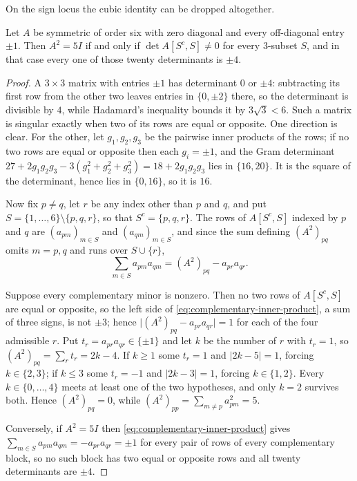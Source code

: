 On the sign locus the cubic identity can be dropped altogether.

\begin{proposition}
\label{prop:nonsingular-complementary-minors}
Let \(A\) be symmetric of order six with zero diagonal and every off-diagonal
entry \(\pm1\).  Then \(A^2=5I\) if and only if \(\det A[S^c,S]\ne0\) for every
\(3\)-subset \(S\), and in that case every one of those twenty determinants is
\(\pm4\).
\end{proposition}

\begin{proof}
A \(3\times3\) matrix with entries \(\pm1\) has determinant \(0\) or \(\pm4\):
subtracting its first row from the other two leaves entries in \(\{0,\pm2\}\)
there, so the determinant is divisible by \(4\), while Hadamard's inequality
bounds it by \(3\sqrt3<6\).  Such a matrix is singular exactly when two of its
rows are equal or opposite.  One direction is clear.  For the other, let
\(g_1,g_2,g_3\) be the pairwise inner products of the rows; if no two rows are
equal or opposite then each \(g_i=\pm1\), and the Gram determinant
\(27+2g_1g_2g_3-3(g_1^2+g_2^2+g_3^2)=18+2g_1g_2g_3\) lies in \(\{16,20\}\).  It
is the square of the determinant, hence lies in \(\{0,16\}\), so it is \(16\).

Now fix \(p\ne q\), let \(r\) be any index other than \(p\) and \(q\), and put
\(S=\{1,\dots,6\}\setminus\{p,q,r\}\), so that \(S^c=\{p,q,r\}\).  The rows of
\(A[S^c,S]\) indexed by \(p\) and \(q\) are \((a_{pm})_{m\in S}\) and
\((a_{qm})_{m\in S}\), and since the sum defining \((A^2)_{pq}\) omits
\(m=p,q\) and runs over \(S\cup\{r\}\),
\begin{equation}
\label{eq:complementary-inner-product}
 \sum_{m\in S}a_{pm}a_{qm}=(A^2)_{pq}-a_{pr}a_{qr}.
\end{equation}

Suppose every complementary minor is nonzero.  Then no two rows of
\(A[S^c,S]\) are equal or opposite, so the left side of
\eqref{eq:complementary-inner-product}, a sum of three signs, is not \(\pm3\);
hence \(\lvert(A^2)_{pq}-a_{pr}a_{qr}\rvert=1\) for each of the four admissible
\(r\).  Put \(t_r=a_{pr}a_{qr}\in\{\pm1\}\) and let \(k\) be the number of
\(r\) with \(t_r=1\), so \((A^2)_{pq}=\sum_rt_r=2k-4\).  If \(k\ge1\) some
\(t_r=1\) and \(\lvert2k-5\rvert=1\), forcing \(k\in\{2,3\}\); if \(k\le3\) some
\(t_r=-1\) and \(\lvert2k-3\rvert=1\), forcing \(k\in\{1,2\}\).  Every
\(k\in\{0,\dots,4\}\) meets at least one of the two hypotheses, and only
\(k=2\) survives both.  Hence \((A^2)_{pq}=0\), while
\((A^2)_{pp}=\sum_{m\ne p}a_{pm}^2=5\).

Conversely, if \(A^2=5I\) then \eqref{eq:complementary-inner-product} gives
\(\sum_{m\in S}a_{pm}a_{qm}=-a_{pr}a_{qr}=\pm1\) for every pair of rows of every
complementary block, so no such block has two equal or opposite rows and all
twenty determinants are \(\pm4\).
\end{proof}

